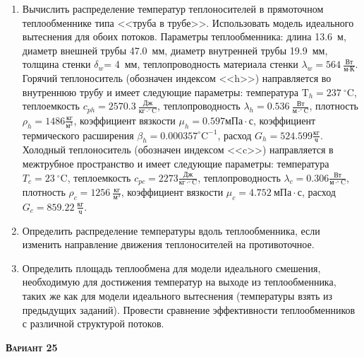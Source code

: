 \begin{enumerate} 
\item Вычислить распределение температур теплоносителей в прямоточном теплообменнике типа <<труба в трубе>>. Использовать модель идеального вытеснения для обоих потоков. Параметры теплообменника: длина  13.6~м, диаметр внешней трубы 47.0~мм,  диаметр внутренней трубы 19.9~мм, толщина стенки $\delta_{w}$=     4~мм,  теплопроводность материала стенки $\lambda_{w}=  564~\frac{\text{Вт}}{\text{м} \cdot \text{К}}$.  Горячий теплоноситель (обозначен индексом <<h>>) направляется во внутреннюю трубу и	 имеет следующие параметры: температура $\text{T}_{h}= 237~^\circ\mathrm{C}$, теплоемкость	  $c_{p{h}}= 2570.3~\frac{\text{Дж}}{\text{кг} \cdot ^\circ\mathrm{C}}$, теплопроводность 		$\lambda_{h}= 0.536~\frac{\text{Вт}}{\text{м} \cdot ^\circ\mathrm{C}}$, плотность 		$\rho_{h}= 1486 \frac{\text{кг}}{\text{м}^3}$, коэффициент вязкости $\mu_{h}=0.597 \text{мПа} 		\cdot \text{с} $, коэффициент термического расширения $\beta_{h}=0.000357 ^\circ\mathrm{C}^{-1}$,		 расход $G_{h}= 524.599 \frac{\text{кг}}{\text{ч}}$. Холодный теплоноситель (обозначен индексом <<c>>) 		 направляется в межтрубное пространство и имеет следующие параметры: температура $T_{c}=   23		 ~^\circ\mathrm{C}$, теплоемкость $c_{p{c}}= 2273 \frac{\text{Дж}}{\text{кг} \cdot ^\circ\mathrm{C}}$,			 теплопроводность $\lambda_{c}=0.306 \frac{\text{Вт}}{\text{м} \cdot ^\circ\mathrm{C}}$, плотность 			 $\rho_{c}=  1256~\frac{\text{кг}}{\text{м}^3}$, коэффициент вязкости $\mu_{c}=4.752~\text{мПа} \cdot \text{с} $, 			 расход $G_{c}=859.22~\frac{\text{кг}}{\text{ч}}$. 

\item Определить распределение температуры вдоль теплообменника, если 	изменить направление движения теплоносителей на противоточное.

\item Определить площадь теплообмена для модели идеального смешения, необходимую для достижения 	температур на выходе из теплообменника, таких же как для модели идеального вытеснения (температуры взять из предыдущих заданий).	Провести сравнение эффективности теплообменников с различной структурой потоков.

\end{enumerate}

\textsc{\textbf{Вариант 25}}

